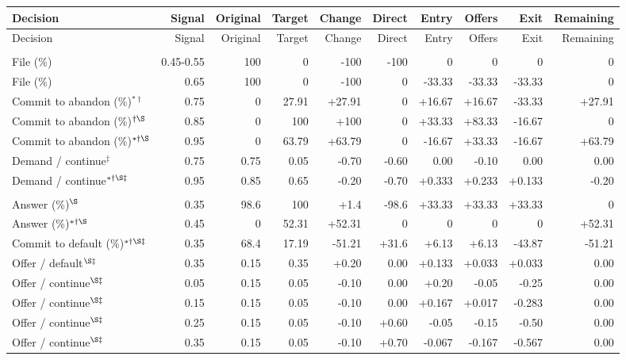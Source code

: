 \documentclass[10pt]{article}
\begin{document}
{\small\setlength{\tabcolsep}{3pt}\begin{longtable}{@{}>{\raggedright\arraybackslash}p{1.65in}rrrrrrrrr@{}}
\toprule Decision & Signal & Original & Target & Change & Direct & Entry & Offers & Exit & Remaining \\\midrule\endfirsthead
\toprule Decision & Signal & Original & Target & Change & Direct & Entry & Offers & Exit & Remaining \\\midrule\endhead
\bottomrule\endfoot
\multicolumn{10}{@{}l}{\textbf{Plaintiff}}\\
File (\%) & 0.45-0.55 & 100 & 0 & -100 & -100 & 0 & 0 & 0 & 0\\
File (\%) & 0.65 & 100 & 0 & -100 & 0 & -33.33 & -33.33 & -33.33 & 0\\
Commit to abandon (\%)$^{*\dagger}$ & 0.75 & 0 & 27.91 & +27.91 & 0 & +16.67 & +16.67 & -33.33 & +27.91\\
Commit to abandon (\%)$^{\dagger\S}$ & 0.85 & 0 & 100 & +100 & 0 & +33.33 & +83.33 & -16.67 & 0\\
Commit to abandon (\%)$^{*\dagger\S}$ & 0.95 & 0 & 63.79 & +63.79 & 0 & -16.67 & +33.33 & -16.67 & +63.79\\
Demand / continue$^{\ddagger}$ & 0.75 & 0.75 & 0.05 & -0.70 & -0.60 & 0.00 & -0.10 & 0.00 & 0.00\\
Demand / continue$^{*\dagger\S\ddagger}$ & 0.95 & 0.85 & 0.65 & -0.20 & -0.70 & +0.333 & +0.233 & +0.133 & -0.20\\
\multicolumn{10}{@{}l}{\textbf{Defendant}}\\
Answer (\%)$^{\S}$ & 0.35 & 98.6 & 100 & +1.4 & -98.6 & +33.33 & +33.33 & +33.33 & 0\\
Answer (\%)$^{*\dagger\S}$ & 0.45 & 0 & 52.31 & +52.31 & 0 & 0 & 0 & 0 & +52.31\\
Commit to default (\%)$^{*\dagger\S\ddagger}$ & 0.35 & 68.4 & 17.19 & -51.21 & +31.6 & +6.13 & +6.13 & -43.87 & -51.21\\
Offer / default$^{\S\ddagger}$ & 0.35 & 0.15 & 0.35 & +0.20 & 0.00 & +0.133 & +0.033 & +0.033 & 0.00\\
Offer / continue$^{\S\ddagger}$ & 0.05 & 0.15 & 0.05 & -0.10 & 0.00 & +0.20 & -0.05 & -0.25 & 0.00\\
Offer / continue$^{\S\ddagger}$ & 0.15 & 0.15 & 0.05 & -0.10 & 0.00 & +0.167 & +0.017 & -0.283 & 0.00\\
Offer / continue$^{\S\ddagger}$ & 0.25 & 0.15 & 0.05 & -0.10 & +0.60 & -0.05 & -0.15 & -0.50 & 0.00\\
Offer / continue$^{\S\ddagger}$ & 0.35 & 0.15 & 0.05 & -0.10 & +0.70 & -0.067 & -0.167 & -0.567 & 0.00\\
\end{longtable}}
\end{document}
